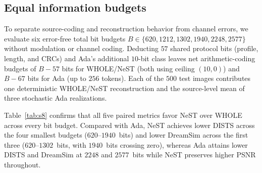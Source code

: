 \documentclass[10pt,letterpaper]{article}
\begin{document}
\subsection{Equal information budgets}
To separate source-coding and reconstruction behavior from channel errors, we evaluate six error-free total bit budgets $B\in\{620, 1212, 1302, 1940, 2248, 2577\}$ without modulation or channel coding. Deducting $57$ shared protocol bits (profile, length, and CRCs) and Ada's additional $10$-bit class leaves net arithmetic-coding budgets of $B-57$ bits for WHOLE/NeST (both using ceiling $(10,0)$) and $B-67$ bits for Ada (up to $256$ tokens). Each of the $500$ test images contributes one deterministic WHOLE/NeST reconstruction and the source-level mean of three stochastic Ada realizations.

Table~\ref{tab:s8} confirms that all five paired metrics favor NeST over WHOLE across every bit budget. Compared with Ada, NeST achieves lower DISTS across the four smallest budgets ($620$--$1940$~bits) and lower DreamSim across the first three ($620$--$1302$~bits, with $1940$~bits crossing zero), whereas Ada attains lower DISTS and DreamSim at $2248$ and $2577$~bits while NeST preserves higher PSNR throughout.
\end{document}
